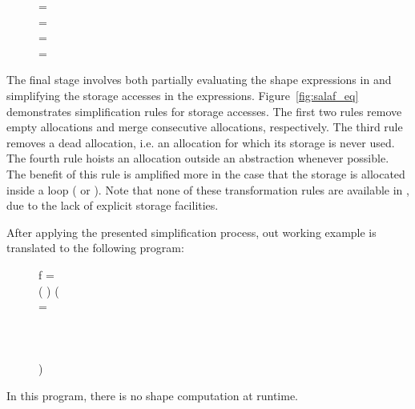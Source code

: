 \begin{figure}[H]
\hfill\begin{minipage}{.75\textwidth}\raggedright
{}  = 
\\
  = 
\\
  = 
\\
  = 
\end{minipage}\hfill
\end{figure}

The final stage involves both partially evaluating the shape expressions in \salafsharp{} and simplifying the storage accesses in the \salafsharp{} expressions. Figure~\ref{fig:salaf_eq} demonstrates simplification rules for storage accesses. The first two rules remove empty allocations 
and merge consecutive allocations, respectively. The third rule removes a dead allocation, 
i.e. an allocation for which its storage is never used. The fourth rule hoists an allocation outside 
an abstraction whenever possible. The benefit of this rule is amplified more in the 
case that the storage is allocated inside a loop (\vcbuild{} or \viteratek{}). Note that none of these
transformation rules are available in \lafsharp{}, due to the lack of explicit storage facilities.

After applying the presented simplification process, out working example is translated to the following program:
\begin{figure}[H]
\hfill\begin{minipage}{.75\textwidth}\raggedright
f = 
\\
\tabt \vallocterm{} ( ) (
\\
\tabt \tabt {}  =
\\
\tabt \tabt \tabt 
{}    \\
\tabt \tabt \tabt \tabt \tabt {}  
\\
\tabt \tabt 
{}   
\\
\tabt )
\end{minipage}\hfill
\end{figure}
\noindent
In this program, there is no shape computation at runtime. 


